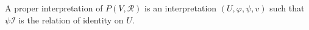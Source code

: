 A proper interpretation of $P(V, \mathcal{R})$ is an interpretation $(U, \varphi, \psi, v)$ such that $\psi\mathcal{I}$ is the relation of identity on $U$.
